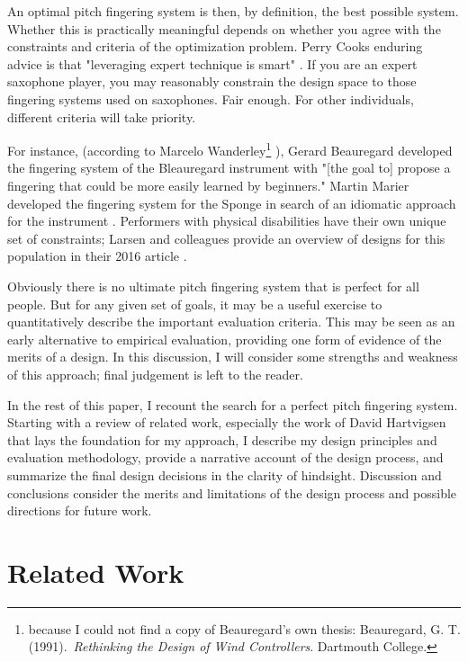 \documentclass[sigconf]{nimeart}
\begin{document}
An optimal pitch fingering system is then, by definition, the best possible system. Whether this is practically meaningful depends on whether you agree with the constraints and criteria of the optimization problem. Perry Cook\textquotesingle s enduring advice is that "leveraging expert technique is smart" \cite{Cook2001b}. If you are an expert saxophone player, you may reasonably constrain the design space to those fingering systems used on saxophones. Fair enough. For other individuals, different criteria will take priority.

For instance, (according to Marcelo Wanderley\footnote{because I could not find a copy of Beauregard's own thesis: Beauregard, G. T. (1991).~\emph{Rethinking the Design of Wind Controllers}. Dartmouth College.} \cite{Wanderley2001a}), Gerard Beauregard developed the fingering system of the Bleauregard instrument with "{[}the goal to{]} propose a fingering that could be more easily learned by beginners." Martin Marier developed the fingering system for the Sponge in search of an idiomatic approach for the instrument \cite{Marier2014}. Performers with physical disabilities have their own unique set of constraints; Larsen and colleagues provide an overview of designs for this population in their 2016 article \cite{Larsen2016}.

Obviously there is no ultimate pitch fingering system that is perfect for all people. But for any given set of goals, it may be a useful exercise to quantitatively describe the important evaluation criteria. This may be seen as an early alternative to empirical evaluation, providing one form of evidence of the merits of a design. In this discussion, I will consider some strengths and weakness of this approach; final judgement is left to the reader.

In the rest of this paper, I recount the search for a perfect pitch fingering system. Starting with a review of related work, especially the work of David Hartvigsen that lays the foundation for my approach, I describe my design principles and evaluation methodology, provide a narrative account of the design process, and summarize the final design decisions in the clarity of hindsight. Discussion and conclusions consider the merits and limitations of the design process and possible directions for future work.

\section{Related Work}\label{related-work}
\end{document}
